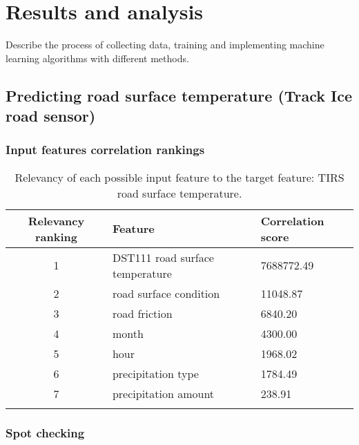 \chapter{Results and analysis}
Describe the process of collecting data, training and implementing machine learning algorithms with different methods.


	
\section{Predicting road surface temperature (Track Ice road sensor)}
	\subsection{Input features correlation rankings}


	\begin{table}[H]
		\centering
		\caption{Relevancy of each possible input feature to the target feature: TIRS road surface temperature. }
		\begin{tabular}[3]{c | l | l }
    			Relevancy ranking & Feature & Correlation score  \\
			 \hline
			1 & DST111 road surface temperature & 7688772.49 \\
			2 & road surface condition & 11048.87 \\
			3 & road friction & 6840.20 \\
			4 & month & 4300.00 \\
			5 & hour & 1968.02 \\
			6 & precipitation type & 1784.49 \\
			7 & precipitation amount & 238.91 \\
 
			\label{table:feature_comparison_tirs}
		\end{tabular}
	\end{table}

	\subsection{Spot checking}

